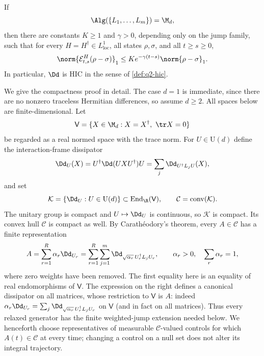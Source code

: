 \documentclass[class=article,11pt,a4paper,crop=false]{standalone}
\begin{document}
\begin{theorem}
\label{thm:q2-uniform-hic}
If
\begin{equation}
  \Alg(\{L_1,\ldots,L_m\})=\M_d,
  \label{eq:q2-full-jump-algebra}
\end{equation}
then there are constants $K\ge1$ and $\gamma>0$, depending only on the jump
family, such that for every $H=H^\dagger\in L^1_{\mathrm{loc}}$, all states
$\rho,\sigma$, and all $t\ge s\ge0$,
\begin{equation}
 \norm{\mathcal E^H_{t,s}(\rho-\sigma)}_1
 \le K e^{-\gamma(t-s)}\norm{\rho-\sigma}_1.
 \label{eq:q2-uniform-bound}
\end{equation}
In particular, $\Dd$ is HIC in the sense of \cref{def:q2-hic}.
\end{theorem}

We give the compactness proof in detail. The case $d=1$ is immediate, since
there are no nonzero traceless Hermitian differences, so assume $d\ge2$. All
spaces below are finite-dimensional. Let
\begin{equation}
  \mathsf V=\{X\in\M_d:X=X^\dagger,\ \tr X=0\}
\end{equation}
be regarded as a real normed space with the trace norm. For $U\in\mathrm
U(d)$ define the interaction-frame dissipator
\begin{equation}
  \Dd_U(X)=U^\dagger\Dd(UXU^\dagger)U
          =\sum_j\Dd_{U^\dagger L_jU}(X),
\end{equation}
and set
\begin{equation}
  \mathcal K=\{\Dd_U:U\in\mathrm U(d)\}
  \subset\operatorname{End}_{\R}(\mathsf V),
  \qquad
  \mathcal C=\operatorname{conv}(\mathcal K).
  \label{eq:q2-control-sets}
\end{equation}
The unitary group is compact and $U\mapsto\Dd_U$ is continuous, so
$\mathcal K$ is compact. Its convex hull $\mathcal C$ is compact as well.
By Carath\'eodory's theorem, every $A\in\mathcal C$ has a finite
representation
\begin{equation}
 A=\sum_{r=1}^R\alpha_r\Dd_{U_r}
   =\sum_{r=1}^R\sum_{j=1}^m
       \Dd_{\sqrt{\alpha_r}\,U_r^\dagger L_jU_r},
 \qquad \alpha_r>0,\quad\sum_r\alpha_r=1,
 \label{eq:q2-caratheodory}
\end{equation}
where zero weights have been removed. The first equality here is an equality
of real endomorphisms of $\mathsf V$. The expression on the right defines a
canonical dissipator on all matrices, whose restriction to $\mathsf V$ is
$A$: indeed $\alpha_r\Dd_{U_r}=\sum_j
\Dd_{\sqrt{\alpha_r}\,U_r^\dagger L_jU_r}$ on $\mathsf V$ (and in fact on all
matrices). Thus every relaxed generator has the finite weighted-jump extension
needed below.
We henceforth choose representatives of measurable $\mathcal C$-valued
controls for which $A(t)\in\mathcal C$ at every time; changing a control on a
null set does not alter its integral trajectory.
\end{document}
